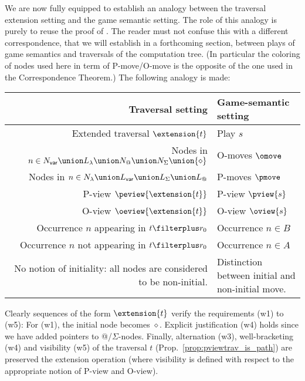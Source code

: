 We are now fully equipped to establish an analogy between the traversal extension setting and the game
semantic setting. The role of this analogy is purely to reuse the
proof of \cite{hylandong_pcf}. The reader must not confuse this with
a different correspondence, that we will establish in a forthcoming
section, between plays of game semantics and traversals of the
computation tree. (In particular the coloring of nodes used here in
term of P-move/O-move is the opposite of the one used in the
Correspondence Theorem.) The following analogy is made:
\begin{center}
\begin{tabular}{r|p{6cm}}
{\bf Traversal setting} & {\bf Game-semantic setting} \\
\hline\hline
Extended traversal $\extension{t}$ & Play $s$ \\
Nodes in $n \in N_{\sf var} \union L_\lambda \union N_@ \union N_\Sigma \union \{\diamond\}$ & O-moves $\omove$ \\
Nodes in $n \in N_\lambda \union L_{\sf var} \union L_\Sigma \union L_@$ & P-moves $\pmove$\\
P-view $\peview{\extension{t}}$  & P-view $\pview{s}$\\
O-view $\oeview{\extension{t}}$  & O-view $\oview{s}$\\
Occurrence $n$ appearing in $t\filterplus r_0$ & Occurrence $n \in B$ \\
Occurrence $n$ not appearing in $t\filterplus r_0$ & Occurrence $n \in A$ \\
\parbox[t]{6cm}{\raggedleft No notion of initiality: all nodes are considered to be non-initial.} & Distinction between initial and non-initial move.
\end{tabular}
\end{center}

Clearly sequences of the form $\extension{t}$ verify the requirements (w1) to (w5): For (w1), the initial node
becomes $\diamond$. Explicit justification (w4) holds since we have added pointers to @/$\Sigma$-nodes.
Finally, alternation (w3), well-bracketing (w4) and visibility (w5) of the traversal $t$ (Prop.\
\ref{prop:pviewtrav_is_path}) are preserved the extension operation
(where visibility is defined with respect to the appropriate
notion of P-view and O-view).

